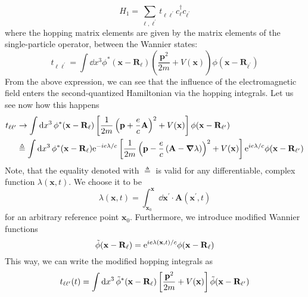 \begin{equation}
    H_{1} = \sum_{\ell,\ell^{\prime} } t_{\ell\ell^{\prime}} c^{\dag}_{\ell}c_{\ell^{\prime}}
\end{equation}
where the hopping matrix elements are given by the matrix elements of the single-particle operator,
between the Wannier states:
\begin{equation}
    t_{\ell\ell^{\prime}} = \int \dd{x^3} \phi^{*}(\mathbf{x} - \mathbf{R}_{\ell})
    \left(\frac{\mathbf{p}^{2}}{2m} + V(\mathbf{x} )\right)\phi(\mathbf{x} - \mathbf{R}_{\ell^{\prime}})
\end{equation}
From the above expression, we can see that the influence of the electromagnetic field enters the second-quantized
Hamiltonian via the hopping integrals. Let us see now how this happens
\begin{align}
    t_{\ell\ell^{\prime}} & \to \int \dd{x^3} \phi^{*}(\mathbf{x} - \mathbf{R}_{\ell})
    \left[\frac{1}{2m}\left( \mathbf{p} + \frac{e}{c} \mathbf{A}  \right)^2  + V(\mathbf{x} )\right]
    \phi(\mathbf{x} - \mathbf{R}_{\ell^{\prime}}) \nonumber                                                                 \\
                          & \triangleq \int \dd{x^3} \phi^{*}(\mathbf{x} - \mathbf{R}_{\ell}) \mathrm{e}^{-i e \lambda / c}
    \left[\frac{1}{2m}\left( \mathbf{p} - \frac{e}{c} \left( \mathbf{A} - \grad{\lambda } \right)   \right)^2  + V(\mathbf{x} )\right]
    \mathrm{e}^{i e \lambda / c} \phi(\mathbf{x} - \mathbf{R}_{\ell^{\prime}})
\end{align}
Note, that the equality denoted with \(\triangleq \) is valid for any differentiable, complex function \(\lambda (\mathbf{x},t)\).
We choose it to be
\begin{equation}
    \lambda (\mathbf{x},t) =  \int_{\mathbf{x}_0 }^{\mathbf{x}} \dd{\mathbf{x}^{\prime}} \cdot \mathbf{A}(\mathbf{x}^{\prime},t)
\end{equation}
for an arbitrary reference point \(\mathbf{x}_0 \). Furthermore, we introduce modified Wannier functions
\begin{equation}
    \Tilde{\phi}(\mathbf{x} - \mathbf{R}_{\ell}) = \mathrm{e}^{i e \lambda(\mathbf{x} ,t) / c} \phi(\mathbf{x} - \mathbf{R}_{\ell})
\end{equation}
This way, we can write the modified hopping integrals as
\begin{equation}
    {t}_{\ell\ell^{\prime}}(t) = \int \dd{x^3} \Tilde{\phi}^{*}(\mathbf{x} - \mathbf{R}_{\ell})
    \left[\frac{\mathbf{p}^2}{2m}  + V(\mathbf{x} )\right]
    \Tilde{\phi}(\mathbf{x} - \mathbf{R}_{\ell^{\prime}})
\end{equation}
